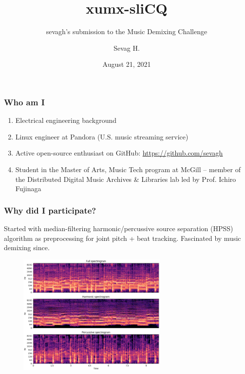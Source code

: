 \documentclass[usenames,dvipsnames]{beamer}
\title{xumx-sliCQ}
\subtitle{sevagh's submission to the Music Demixing Challenge}
\author{Sevag H.}
\date{August 21, 2021}
\begin{document}
\begin{frame}
\maketitle
\end{frame}

\begin{frame}
	\frametitle{Who am I}
	\begin{enumerate}
		\item
			Electrical engineering background
		\item
			Linux engineer at Pandora (U.S. music streaming service)
		\item
			Active open-source enthusiast on GitHub: \href{https://github.com/sevagh}{https://github.com/sevagh}
		\item
			Student in the Master of Arts, Music Tech program at McGill -- member of the Distributed Digital Music Archives \& Libraries lab led by Prof. Ichiro Fujinaga
	\end{enumerate}
\end{frame}

\begin{frame}
	\frametitle{Why did I participate?}
	Started with median-filtering harmonic/percussive source separation (HPSS) algorithm as preprocessing for joint pitch + beat tracking. Fascinated by music demixing since.
	\begin{figure}[ht]
		\centering
		\vspace{-0.5em}
		\includegraphics[height=6cm]{./images-misc/hpss.png}
	\end{figure}
\end{frame}
\end{document}
